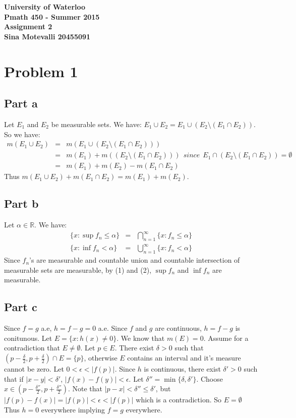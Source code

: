 \documentclass[12pt]{article}
\begin{document}
\begin{center}
  {\Large\bf University of Waterloo}\\
  \vspace{3mm}
         {\Large\bf Pmath 450 - Summer 2015}\\
         \vspace{2mm}
                {\Large\bf Assignment 2}\\
                \vspace{3mm}
                \textbf{Sina Motevalli 20455091}
\end{center}
\section*{Problem 1}
\subsection*{Part a}
Let $E_1$ and $E_2$ be measurable sets. 
We have: $E_1 \cup E_2 = E_1 \cup (E_2 \setminus (E_1 \cap E_2))$. \\
So we have:
\begin{eqnarray*}
m(E_1 \cup E_2) &=& m(E_1 \cup (E_2 \setminus (E_1 \cap E_2)))
\\ &=&
m(E_1)+m((E_2 \setminus (E_1 \cap E_2)))
\ \  since \ \ E_1 \cap (E_2 \setminus (E_1 \cap E_2)) =\emptyset
\\ &=&
m(E_1)+m(E_2)-m(E_1 \cap E_2)
\end{eqnarray*}
Thus $m(E_1 \cup E_2)+m(E_1 \cap E_2)=m(E_1)+m(E_2)$.
\subsection*{Part b}
Let $\alpha \in \mathbb{R}$. We have:
\begin{eqnarray}
\{x : \sup f_n \le \alpha\} &=& \bigcap_{n=1}^{\infty} \{x:f_n \le \alpha\}
\\
\{x : \inf f_n < \alpha\} &=& \bigcup_{n=1}^{\infty} \{x:f_n<\alpha\}
\end{eqnarray}
Since $f_n$'s are measurable and countable union and countable intersection of measurable sets are measurable, by (1) and (2), $\sup f_n$ and $\inf f_n$ are measurable.
\subsection*{Part c}
Since $f=g$ a.e, $h=f-g=0$ a.e. Since $f$ and $g$ are continuous, $h=f-g$ is conitunous. Let $E=\{x:h(x) \not=0\}$. We know that $m(E)=0$. Assume for a contradiction that $E \not= \emptyset$.
Let $p \in E$. There exist $\delta >0$ such that
$(p-\frac{\delta}{2},p+\frac{\delta}{2}) \cap E = \{p\}$, otherwise $E$ contains an interval and it's measure cannot be zero.
Let $0 < \epsilon < |f(p)|$. Since $h$ is continuous, there exist $\delta' >0$ such that if $|x-y| < \delta'$, $|f(x)-f(y)| < \epsilon$. Let $\delta''=\min \{\delta , \delta' \}$. Choose $x \in (p-\frac{\delta''}{2},p+\frac{\delta''}{2})$. Note that $|p-x| < \delta'' \le \delta'$, but $|f(p)-f(x)|=|f(p)| < \epsilon < |f(p)|$
which is a contradiction. So $E=\emptyset$ \\
Thus $h=0$ everywhere implying $f=g$ everywhere.
\end{document}
